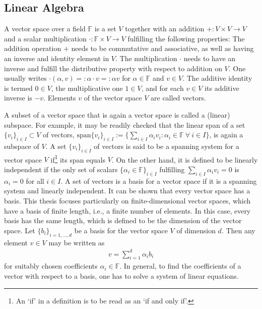 \subsection{Linear Algebra}
A vector space over a field $\mathbb F$ is a set $V$ together with an addition $+:V \times V \rightarrow V$ and a scalar multiplication $\cdot : \mathbb F \times V \rightarrow V$ fulfilling the following properties: The addition operation $+$ needs to be commutative and associative, as well as having an inverse and identity element in $V$. The multiplication $\cdot$ needs to have an inverse and fulfill the distributive property with respect to addition on $V$. One usually writes $\cdot(\alpha, v)=:\alpha\cdot v=: \alpha v$ for $\alpha \in \mathbb F$ and $v \in V$. The additive identity is termed $0 \in V$, the multiplicative one $1\in V$, and for each $v \in V$ its additive inverse is $-v$. Elements $v$ of the vector space $V$ are called vectors. 

A subset of a vector space that is again a vector space is called a (linear) subspace. For example, it may be readily checked that the linear span of a set $\{v_i\}_{i\in I} \subset V$ of vectors, $\mathrm{span}\{v_i\}_{i\in I}:=\{\sum_{i\in I}\alpha_i v_i :  \alpha_i \in \mathbb F\  \forall \  i \in I\} $, is again a subspace of $V$. A set $\{v_i\}_{i\in I}$ of vectors is said to be a spanning system for a vector space $V$ if\footnote{An `if' in a definition is to be read as an `if and only if'.} its span equals $V$. On the other hand, it is defined to be linearly independent if the only set of scalars $\{\alpha_i \in \mathbb F\}_{i\in I}$ fulfilling $\sum_{i \in I}\alpha_i v_i = 0$ is $\alpha_i = 0$ for all $i \in I$. A set of vectors is a basis for a vector space if it is a spanning system and linearly independent. It can be shown that every vector space has a basis. This thesis focuses particularly on finite-dimensional vector spaces, which have a basis of finite length, i.e., a finite number of elements. In this case, every basis has the same length, which is defined to be the dimension of the vector space. Let $\{b_i\}_{i=1,\dots,d}$ be a basis for the vector space $V$ of dimension $d$. Then any element $v \in V$ may be written as 
\begin{align}\label{eq:coefficient_expansion}
v = \sum_{i=1}^d \alpha_i b_i
\end{align}
for suitably chosen coefficients $\alpha_i \in \mathbb F$. In general, to find the coefficients of a vector with respect to a basis, one has to solve a system of linear equations.


